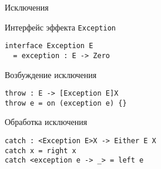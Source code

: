\begin{frame}[fragile]{Исключения}
\begin{block}{Интерфейс эффекта \texttt{Exception}}
\begin{verbatim}
interface Exception E
  = exception : E -> Zero
\end{verbatim}
\end{block}
\pause
\begin{block}{Возбуждение исключения}
\begin{verbatim}
throw : E -> [Exception E]X
throw e = on (exception e) {}
\end{verbatim}
\end{block}
\pause
\begin{block}{Обработка исключения}
\begin{verbatim}
catch : <Exception E>X -> Either E X
catch x = right x
catch <exception e -> _> = left e
\end{verbatim}
\end{block}

\end{frame}



